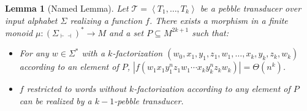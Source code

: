 \documentclass{article}
\newcommand{\atuple}[1]{\left\langle #1 \right\rangle}
\newcommand{\Tt}{\mathcal T}
\newtheorem{lemma}[theorem]{Lemma}
\theoremstyle{definition}
\theoremstyle{remark}
\begin{document}
\begin{lemma}[Named Lemma]\label{lem:name}
    Let $\Tt=\atuple{T_1,\ldots,T_k}$ be a pebble transducer over input alphabet $\Sigma$ realizing a function $f$.
    There exists a morphism in a finite monoid $\mu:(\Sigma_{\vdash\dashv})^*\to M$ and a set $P\subseteq M^{2k+1}$ such that:
    \begin{itemize}
    \item For any $w\in \Sigma^*$ with a $k$-factorization 
    $(w_0,x_{1},y_1,z_1,w_1,\ldots,x_k,y_k,z_k, w_k)$ according to an element of $P$, $|f(w_1x_1y_{1}^nz_1w_1\cdots x_ky_k^nz_kw_k)|=\Theta(n^k)$.
    \item $f$ restricted to words without $k$-factorization according to any element of $P$ can be realized by a $k{-}1$-pebble transducer.
    \end{itemize}
    
\end{lemma}
\end{document}
